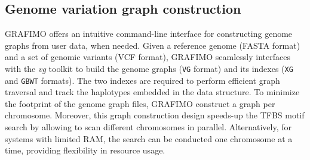 \documentclass[a4paper, titlepage, openright]{book}
\newcommand{\grafimo}{GRAFIMO\xspace}
\begin{document}
\subsection{Genome variation graph construction}
\grafimo offers an intuitive command-line interface for constructing genome graphs from user data, when needed. Given a reference genome (FASTA format) and a set of genomic variants (VCF format), \grafimo seamlessly interfaces with the \emph{vg} toolkit to build the genome graphs (\texttt{VG} format) and its indexes (\texttt{XG} \citep{garrison2018variation} and \texttt{GBWT} \citep{siren2020haplotype, novak2017graph} formats). The two indexes are required to perform efficient graph traversal and track the haplotypes embedded in the data structure. To minimize the footprint of the genome graph files, \grafimo construct a graph per chromosome. Moreover, this graph construction design speeds-up the TFBS motif search by allowing to scan different chromosomes in parallel. Alternatively, for systems with limited RAM, the search can be conducted one chromosome at a time, providing flexibility in resource usage.

%
%
\end{document}
